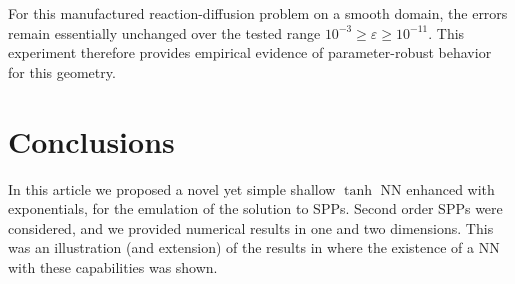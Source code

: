 \documentclass[11pt]{article}
\theoremstyle{plain}
\theoremstyle{definition}
\theoremstyle{remark}
\numberwithin{equation}{section}
\begin{document}
For this manufactured reaction-diffusion problem on a smooth domain, the errors remain essentially unchanged over the tested range $10^{-3}\geq\varepsilon\geq10^{-11}$. This experiment therefore provides empirical evidence of parameter-robust behavior for this geometry.



\section{Conclusions}
\label{sec:Concl}
In this article we proposed a novel yet simple shallow $\tanh$ NN enhanced with exponentials, for the emulation of the solution to SPPs. Second order SPPs were considered, and we provided numerical results in one and two dimensions. This was an illustration (and extension) of the results in \cite{OSX} where the existence of a NN with these capabilities was shown.
\end{document}
